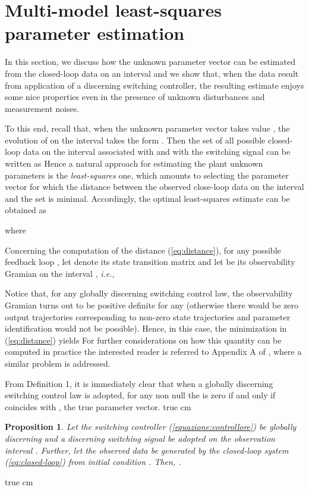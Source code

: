 \documentclass[letterpaper, 10 pt, conference]{ieeetran}
\def\qedp{\hspace*{\fill}~{\tiny }}
\def\salt{\vskip 0.2 true cm}
\newtheorem{itproposition}{Proposition}
\newenvironment{proposition}{\begin{itproposition}\rm}{\end{itproposition}}
\begin{document}
\section{Multi-model least-squares parameter estimation}


In this section, we discuss how the unknown parameter vector  can be estimated from the closed-loop data  on an interval
 and we show that, when the data result from application of a discerning switching controller, the resulting estimate enjoys some nice 
properties even in the presence of unknown disturbances and measurement noises.

To this end, recall that, when the unknown parameter vector takes value , the evolution of  on the interval
 takes the form . Then the set  of all possible
closed-loop data on the interval  associated with  and with the switching signal  can be written as
{\setlength\arraycolsep{0pt} 
}Hence a natural approach for estimating the plant unknown parameters is the {\em least-squares} one, which
amounts to selecting the parameter vector  for which the distance between the observed close-loop data  on the interval 
 and the set 
is minimal. Accordingly, the optimal least-squares estimate  can be obtained as

where


Concerning the computation of the distance (\ref{eq:distance}), for any possible feedback loop
, let   denote its state transition matrix  and let  be 
its observability Gramian on the interval , \emph{i.e.},

Notice that, for any globally discerning switching control law, the observability Gramian 
 turns out to be
positive definite for any  (otherwise there would be zero output trajectories corresponding to non-zero state trajectories and
parameter identification would not be possible). Hence, in this case, 
the minimization in (\ref{eq:distance}) yields
{\setlength\arraycolsep{0pt} 
}For further considerations on how this quantity can be computed in practice the interested reader is referred to Appendix A of \cite{BaBaTe13},
where a similar problem is addressed.

From Definition 1, it is immediately clear that when a globally discerning switching control law is adopted, for any non null  the  is zero if and only if
 coincides with , the true parameter vector.\salt

\begin{proposition}\label{prop:least-squares}
Let the switching controller (\ref{equazione:controllore}) be globally discerning and
a discerning switching signal  be adopted on the observation interval . Further, let the observed
data  be generated by the closed-loop system (\ref{eq:closed-loop}) from initial condition 
. Then, .
\qedp
\end{proposition}
\salt
\end{document}
